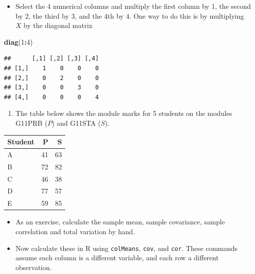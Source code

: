 \documentclass[]{book}
\newenvironment{Shaded}{\begin{snugshade}}{\end{snugshade}}
\newcommand{\DecValTok}[1]{\textcolor[rgb]{0.00,0.00,0.81}{#1}}
\newcommand{\KeywordTok}[1]{\textcolor[rgb]{0.13,0.29,0.53}{\textbf{#1}}}
\newcommand{\NormalTok}[1]{#1}
\newcommand{\OperatorTok}[1]{\textcolor[rgb]{0.81,0.36,0.00}{\textbf{#1}}}
\providecommand{\tightlist}{%
  \setlength{\itemsep}{0pt}\setlength{\parskip}{0pt}}
\theoremstyle{definition}
\theoremstyle{definition}
\theoremstyle{definition}
\theoremstyle{remark}
\begin{document}
\begin{itemize}
\tightlist
\item
  Select the 4 numerical columns and multiply the first column by 1, the second by 2, the third by 3, and the 4th by 4. One way to do this is by multiplying \(X\) by the diagonal matrix
\end{itemize}

\begin{Shaded}
\begin{Highlighting}[]
\KeywordTok{diag}\NormalTok{(}\DecValTok{1}\OperatorTok{:}\DecValTok{4}\NormalTok{)}
\end{Highlighting}
\end{Shaded}

\begin{verbatim}
##      [,1] [,2] [,3] [,4]
## [1,]    1    0    0    0
## [2,]    0    2    0    0
## [3,]    0    0    3    0
## [4,]    0    0    0    4
\end{verbatim}

\begin{enumerate}
\def\labelenumi{\arabic{enumi}.}
\setcounter{enumi}{1}
\tightlist
\item
  The table below shows the module marks for 5 students on the modules G11PRB (\(P\)) and G11STA (\(S\)).
\end{enumerate}

\begin{table}[H]
\centering
\begin{tabular}{lrr}
\toprule
Student & P & S\\
\midrule
A & 41 & 63\\
B & 72 & 82\\
C & 46 & 38\\
D & 77 & 57\\
E & 59 & 85\\
\bottomrule
\end{tabular}
\end{table}

\begin{itemize}
\tightlist
\item
  As an exercise, calculate the sample mean, sample covariance, sample correlation and total variation by hand.
\end{itemize}

\begin{itemize}
\tightlist
\item
  Now calculate these in R using \texttt{colMeans}, \texttt{cov}, and \texttt{cor}. These commands assume each column is a different variable, and each row a different observation.
\end{itemize}
\end{document}
